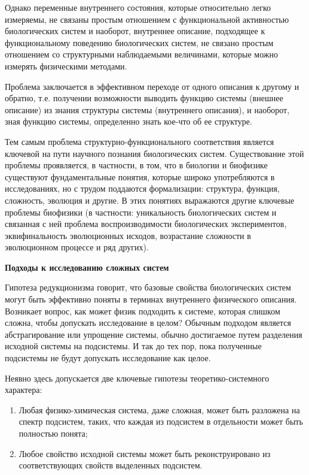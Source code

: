 \documentclass[12pt,a4paper,oneside]{book}
\begin{document}
Однако переменные внутреннего состояния, которые относительно легко измеряемы, не связаны простым отношением с функциональной активностью биологических систем и наоборот, внутреннее описание, подходящее к функциональному поведению биологических систем, не связано простым отношением со структурными наблюдаемыми величинами, которые можно измерять физическими методами.

Проблема заключается в эффективном переходе от одного описания к другому и обратно, т.е. получении возможности выводить функцию системы (внешнее описание) из знания структуры системы (внутреннего описания), и наоборот, зная функцию системы, определенно знать кое-что об ее структуре.

Тем самым проблема структурно-функционального соответствия является ключевой на пути научного познания биологических систем. Существование этой проблемы проявляется, в частности, в том, что в биологии и биофизике существуют фундаментальные понятия, которые широко употребляются в исследованиях, но с трудом поддаются формализации: структура, функция, сложность, эволюция и другие. В этих понятиях выражаются другие ключевые проблемы биофизики (в частности: уникальность биологических систем и связанная с ней проблема воспроизводимости биологических экспериментов, эквифинальность эволюционных исходов, возрастание сложности в эволюционном процессе и ряд других). 

{\bf Подходы к исследованию сложных систем}

Гипотеза редукционизма говорит, что базовые свойства биологических систем могут быть эффективно поняты в терминах внутреннего физического описания. Возникает вопрос, как может физик подходить к системе, которая слишком сложна, чтобы допускать исследование в целом? Обычным подходом является абстрагирование или упрощение системы, обычно достигаемое путем разделения исходной системы на подсистемы. И так до тех пор, пока полученные подсистемы не будут допускать исследование как целое.

Неявно здесь допускается две ключевые гипотезы теоретико-системного характера:
\begin{enumerate}
\item Любая физико-химическая система, даже сложная, может быть разложена на спектр подсистем, таких, что каждая из подсистем в отдельности может быть полностью понята;
\item Любое свойство исходной системы может быть реконструировано из соответствующих свойств выделенных подсистем.
\end{enumerate}
\end{document}
